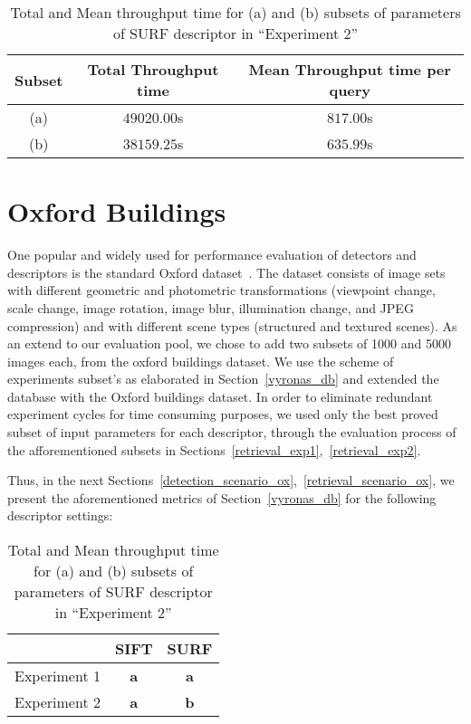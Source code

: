             \begin{table}[H]
                \centering
                \large\begin{tabular}{|c|c|c|}
                   \hline
                    \textbf{Subset} & \textbf{Total Throughput time} & \textbf{Mean Throughput time per query}\\ \hline	      
                    (a) & $49020.00$s & $817.00$s \\
                    (b) & $38159.25$s & $635.99$s \\ \cline{1-3}
                \end{tabular}	      
                \caption{Total and Mean throughput time for (a) and (b) subsets of parameters of SURF descriptor in ``Experiment 2''}
                \label{table:exp2_surf_bench}
            \end{table}            

    \newpage
    
   \section{Oxford Buildings}\label{oxfordsec}    
   
	One popular and widely used for performance evaluation
    of detectors and descriptors is the standard Oxford dataset~\cite{oxford}.
    The dataset consists of image sets with different geometric and photometric transformations (viewpoint change, scale change, image rotation, image blur, illumination change, and JPEG compression) 
    and with different scene types (structured and textured scenes).
	As an extend to our evaluation pool, we chose to add two subsets of 1000 and 5000 images each, from the oxford buildings dataset.
	We use the scheme of experiments subset's as elaborated in Section~\ref{vyronas_db} and extended the database with the Oxford buildings dataset.
	In order to eliminate redundant experiment cycles for time consuming purposes, we used  only the 
	best proved subset of input parameters for each descriptor, through the evaluation process of the afforementioned subsets in Sections~\ref{retrieval_exp1},~\ref{retrieval_exp2}.
	
	Thus, in the next Sections~\ref{detection_scenario_ox},~\ref{retrieval_scenario_ox}, we present the aforementioned metrics	of Section~\ref{vyronas_db} for the following descriptor settings:

      \begin{table}[H]
	  \centering
	  \large\begin{tabular}{|c|c|c|}
	    \hline
		  & SIFT & SURF\\ \hline				      
	      Experiment 1 & \textbf{a} & \textbf{a} \\
	      Experiment 2 & \textbf{a} & \textbf{b} \\ \cline{1-3}
	  \end{tabular}	      
	  \caption{Total and Mean throughput time for (a) and (b) subsets of parameters of SURF descriptor in ``Experiment 2''}
	  \label{table:exp2_surf_bench}
      \end{table}	
         
